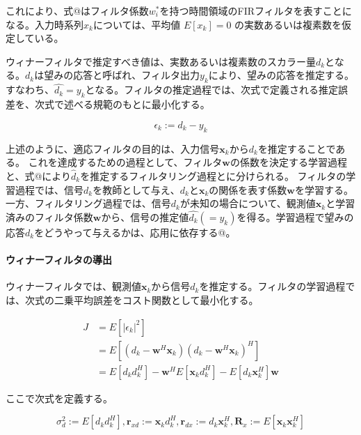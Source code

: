 これにより、式@はフィルタ係数\({w_i^*}\)を持つ時間領域のFIRフィルタを表すことになる。入力時系列\({x_k}\)については、平均値
\(E[x_k]=0\) の実数あるいは複素数を仮定している。

ウィナーフィルタで推定すべき値は、実数あるいは複素数のスカラー量\(d_k\)となる。\(d_k\)は望みの応答と呼ばれ、フィルタ出力\(y_k\)により、望みの応答を推定する。すなわち、\(\hat{d_k} = y_k\)となる。フィルタの推定過程では、次式で定義される推定誤差を、次式で述べる規範のもとに最小化する。

\begin{equation}
\epsilon_k := d_k - y_k
\end{equation}

上述のように、適応フィルタの目的は、入力信号\(\bm{x}_k\)から\(d_k\)を推定することである。
これを達成するための過程として、フィルタ\(\bm{w}\)の係数を決定する学習過程と、式@により\(\hat{d}_k\)を推定するフィルタリング過程とに分けられる。
フィルタの学習過程では、信号\(d_k\)を教師として与え、\(d_k\)と\(\bm{x}_k\)の関係を表す係数\(\bm{w}\)を学習する。
一方、フィルタリング過程では、信号\(d_k\)が未知の場合について、観測値\(\bm{x}_k\)と学習済みのフィルタ係数\(\bm{w}\)から、信号の推定値\(\hat{d_k} (= y_k)\)を得る。学習過程で望みの応答\(d_k\)をどうやって与えるかは、応用に依存する@。

\paragraph{ウィナーフィルタの導出}\label{wiener-introduction}

ウィナーフィルタでは、観測値\(\bm{x}_k\)から信号\(d_k\)を推定する。フィルタの学習過程では、次式の二乗平均誤差をコスト関数として最小化する。

\begin{equation}
\begin{split}
J &= E[|\epsilon_k|^2] \\
  &= E[ (d_k - \bm{w}^H \bm{x}_k) (d_k - \bm{w}^H \bm{x}_k)^H ] \\
  &= E[ d_k d_k^H] - \bm{w}^H E[\bm{x}_k d_k^H] - E[d_k \bm{x}_k^H ] \bm{w} 
\end{split}
\end{equation}

ここで次式を定義する。

\begin{equation}
\sigma_d^2 := E[d_k d_k^H], \bm{r}_{xd} := \bm{x}_k d_k^H, \bm{r}_{dx} := d_k \bm{x}_k^H, \bm{R}_x := E[\bm{x}_k \bm{x}_k^H]
\end{equation}

